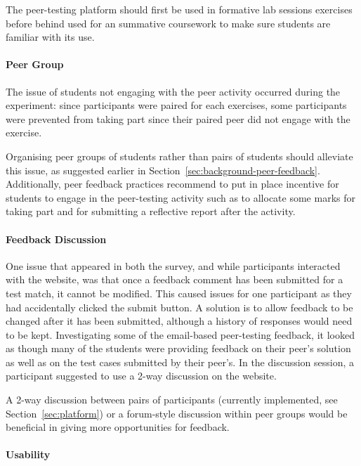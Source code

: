 \documentclass[sigplan,10pt,review]{acmart}\settopmatter{printfolios=true}
\begin{document}
The peer-testing platform should first be used in formative lab
sessions exercises before behind used for an summative coursework to
make sure students are familiar with its use.

\paragraph{Peer Group}

The issue of students not engaging with the peer activity occurred
during the experiment: since participants were paired for each
exercises, some participants were prevented from taking part since
their paired peer did not engage with the exercise.

Organising peer groups of students rather than pairs of students
should alleviate this issue, as suggested earlier in
Section~\ref{sec:background-peer-feedback}. Additionally, peer
feedback practices recommend to put in place incentive for students to
engage in the peer-testing activity such as to allocate some marks for
taking part and for submitting a reflective report after the activity.

\paragraph{Feedback Discussion}


One issue that appeared in both the survey, and while participants
interacted with the website, was that once a feedback comment has been
submitted for a test match, it cannot be modified. This caused issues
for one participant as they had accidentally clicked the submit
button. A solution is to allow feedback to be changed after it has
been submitted, although a history of responses would need to be kept.
Investigating some of the email-based peer-testing feedback, it looked
as though many of the students were providing feedback on their peer's
solution as well as on the test cases submitted by their peer's.
In the discussion session, a participant suggested to use a 2-way
discussion on the website.

A 2-way discussion between pairs of participants (currently
implemented, see Section~\ref{sec:platform}) or a forum-style
discussion within peer groups would be beneficial in giving more
opportunities for feedback.

\paragraph{Usability}
\end{document}
